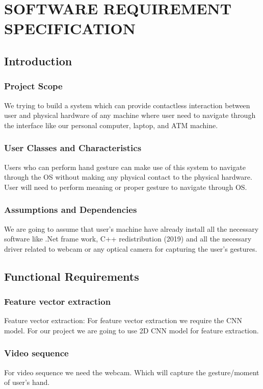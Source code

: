\documentclass[oneside,a4paper,12pt]{report}
\begin{document}
\chapter{SOFTWARE REQUIREMENT SPECIFICATION}

    \section{Introduction}
        \subsection{Project Scope}
            We trying to build a system which can provide contactless interaction between user and physical hardware of any machine where user need to navigate through the interface like our personal computer, laptop, and ATM machine.
        \subsection{User Classes and Characteristics}
            Users who can perform hand gesture can make use of this system to navigate through the OS without making any physical contact to the physical hardware. User will need to perform meaning or proper gesture to navigate through OS.
        \subsection{Assumptions and Dependencies}
            We are going to assume that user’s machine have already install all the necessary software like .Net frame work, C++ redistribution (2019) and all the necessary driver related to webcam or any optical camera for capturing the user’s gestures.
            
            
            
    \section{Functional Requirements}
        \subsection{Feature vector extraction}
            Feature vector extraction: For feature vector extraction we require the CNN model. For our project we are going to use 2D CNN model for feature extraction. 
        \subsection{Video sequence}
            For video sequence we need the webcam. Which will capture the gesture/moment of user’s hand.
\end{document}

